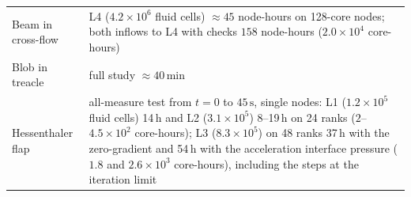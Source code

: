 \begin{table}[htbp]
\begin{tabular}{p{3.0cm}p{10.8cm}}
		Beam in cross-flow & L4 ($4.2\times10^{6}$ fluid cells) $\approx45$ node-hours on 128-core nodes; both inflows to L4 with checks $158$ node-hours ($2.0\times10^{4}$ core-hours) \\
		Blob in treacle & full study $\approx40$\,min \\
		Hessenthaler flap & all-measure test from $t = 0$ to $45\,\mathrm{s}$, single nodes: L1 ($1.2\times10^{5}$ fluid cells) 14\,h and L2 ($3.1\times10^{5}$) 8--19\,h on 24 ranks ($2$--$4.5\times10^{2}$ core-hours); L3 ($8.3\times10^{5}$) on 48 ranks 37\,h with the zero-gradient and 54\,h with the acceleration interface pressure ($1.8$ and $2.6\times10^{3}$ core-hours), including the steps at the iteration limit \\
		\bottomrule
	\end{tabular}
\end{table}

